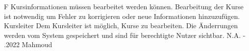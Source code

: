 \begin{myreq}
    \threeinline
    {\reqno }
    {\reqtype F}
    {}
    \reqdesc Kursinformationen müssen bearbeitet werden können.
    \reqrat Bearbeitung der Kurse ist notwendig um Fehler zu korrigieren oder neue Informationen hinzuzufügen.
    \reqorig Kursleiter
    \reqfit Dem Kursleiter ist möglich, Kurse zu bearbeiten. Die Änderrungen werden vom System gespeichert und sind für berechtigte Nutzer sichtbar.
    \twoinline
    {}
    {}
    \twoinline
    {}
    {\reqconf N.A.}
    \reqmater -
    .2022 Mahmoud
\end{myreq}